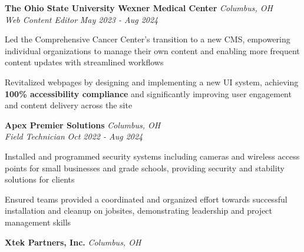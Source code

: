\documentclass[letterpaper]{article}
\begin{document}
    \textbf{The Ohio State University Wexner Medical Center} \hfill \textsl{Columbus, OH}\\
    
    \textit{Web Content Editor} \hfill \textsl{May 2023 - Aug 2024}\\
    \vspace{-7pt}
    \begin{tightitemize} \itemsep -1mm
        
            \item Led the Comprehensive Cancer Center's transition to a new CMS, empowering individual organizations to manage their own content and enabling more frequent content updates with streamlined workflows
            
            \item Revitalized webpages by designing and implementing a new UI system, achieving \textbf{100\% accessibility compliance} and significantly improving user engagement and content delivery across the site

    \end{tightitemize}
    \vspace{-2mm}

    \textbf{Apex Premier Solutions} \hfill \textsl{Columbus, OH}\\
    
    \textit{Field Technician} \hfill \textsl{Oct 2022 - Aug 2024}\\
    \vspace{-7pt}
    \begin{tightitemize} \itemsep -1mm
        
            \item Installed and programmed security systems including cameras and wireless access points for small businesses and grade schools, providing security and stability solutions for clients
            
            \item Ensured teams provided a coordinated and organized effort towards successful installation and cleanup on jobsites, demonstrating leadership and project management skills

    \end{tightitemize}
    \vspace{-2mm}

    \textbf{Xtek Partners, Inc.} \hfill \textsl{Columbus, OH}\\
    
\end{document}
